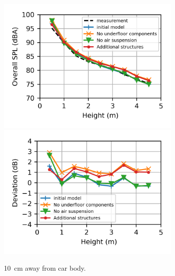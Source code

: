 \begin{figure}
	\centering
	\begin{subfigure}[b]{\textwidth}
		\centering
		\includegraphics{fig/chap5/geometry_variation/overall_SPL/pos_a.png}
		\hfill
		\includegraphics{fig/chap5/geometry_variation/overall_SPL/pos_a_deviation.png}
		\caption{\SI{10}{\centi\meter} away from car body.}
	\end{subfigure}
	\\
	\begin{subfigure}[b]{\textwidth}
		\centering

\end{subfigure}
\end{figure}

